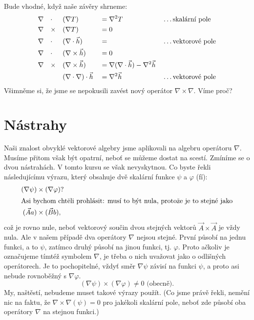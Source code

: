 {    Bude vhodné, když naše závěry shrneme:
    \begin{alignat*}{5}
      &\nabla && \cdot  && (\nabla T)          &&= \nabla^2 T && \ldots \text{skalární pole}   \\
      &\nabla && \times && (\nabla T)          &&= 0          &&                               \\
      &\nabla && \cdot  && (\nabla\cdot\vec{h})        &&=            && \ldots \text{vektorové pole}  \\
      &\nabla && \cdot  && (\nabla\times\vec{h})          &&= 0          &&                               \\
      &\nabla && \times && (\nabla\times\vec{h})          &&= \nabla(\nabla\cdot\vec{h}) - \nabla^2\vec{h}&&      \\
      &       &&        && (\nabla\cdot\nabla)\cdot\vec{h} &&= \nabla^2\vec{h} && \ldots
      \text{vektorové pole}
    \end{alignat*}
    Všimněme si, že jsme se nepokusili zavést nový operátor \(\nabla\times\nabla\). Víme proč?
    
  \section{Nástrahy}\label{sec:fey_diff_traps}
    \cite[s.~41]{Feynman02} Naši znalost obvyklé vektorové algebry jsme aplikovali na algebru 
    operátoru \(\nabla\). Musíme přitom však být opatrní, neboť se můžeme dostat na scestí. Zmíníme 
    se o dvou nástrahách. V tomto kursu se však nevyskytnou. Co byste řekli následujícímu výrazu, 
    který obsahuje dvě skalární funkce \(\psi\) a \(\varphi\) (fí):
    \begin{align}
      (\nabla\psi) &\times(\nabla\varphi)?  \nonumber \\
      \shortintertext{Asi bychom chtěli prohlásit: musí to být nula, protože je to stejné jako}
      (\vec{A}a)   &\times(\vec{B}b),       \nonumber 
    \end{align}
    což je rovno nule, neboť vektorový součin dvou stejných vektorů \(\vec{A}\times\vec{A}\) je 
    vždy nula. Ale v našem případě dva operátory \(\nabla\) nejsou stejné. První působí na jednu 
    funkci, a to \(\psi\), zatímco druhý působí na jinou funkci, tj. \(\varphi\). Proto ačkoliv je 
    označujeme tímtéž symbolem  \(\nabla\), je třeba o nich uvažovat jako o odlišných operátorech. 
    Je to pochopitelné, vždyť směr \(\nabla\psi\) závisí na funkci \(\psi\), a proto asi nebude 
    rovnoběžný s \(\nabla\varphi\).
    \begin{equation*}
      (\nabla\psi)\times(\nabla\varphi)\neq0 \text{ (obecně)}. 
    \end{equation*}
    My, naštěstí, nebudeme muset takové výrazy použít. (Co jsme právě řekli, nemění nic na faktu, 
    že \(\nabla\times\nabla(\psi)=0\) pro jakékoli skalární pole, neboť zde působí oba operátory 
    \(\nabla\) na stejnou funkci.)

}
